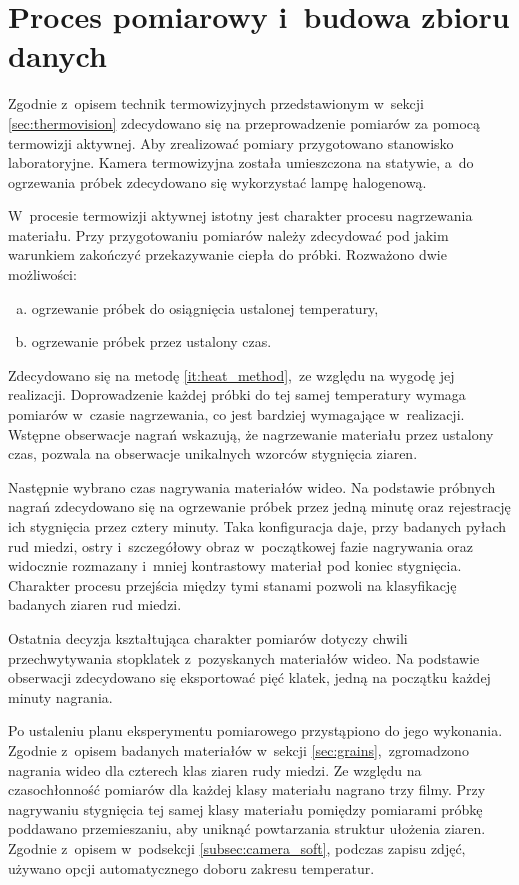 \section{Proces pomiarowy i~budowa zbioru danych} \label{sec:meas}
Zgodnie z~opisem technik termowizyjnych przedstawionym w~sekcji
\ref{sec:thermovision} zdecydowano się na przeprowadzenie pomiarów za pomocą
termowizji aktywnej.
Aby zrealizować pomiary przygotowano stanowisko laboratoryjne.
Kamera termowizyjna została umieszczona na statywie, a~do ogrzewania próbek
zdecydowano się wykorzystać lampę halogenową.

W~procesie termowizji aktywnej istotny jest charakter procesu nagrzewania
materiału.
Przy przygotowaniu pomiarów należy zdecydować pod jakim warunkiem zakończyć
przekazywanie ciepła do próbki.
Rozważono dwie możliwości:
\begin{enumerate}[a)]
	\item ogrzewanie próbek do osiągnięcia ustalonej temperatury,
	\item \label{it:heat_method}
	      ogrzewanie próbek przez ustalony czas.
\end{enumerate}
Zdecydowano się na metodę \ref{it:heat_method},~ze względu na wygodę jej
realizacji.
Doprowadzenie każdej próbki do tej samej temperatury wymaga pomiarów
w~czasie nagrzewania, co jest bardziej wymagające w~realizacji.
Wstępne obserwacje nagrań wskazują, że nagrzewanie materiału przez ustalony
czas, pozwala na obserwacje unikalnych wzorców stygnięcia ziaren.

Następnie wybrano czas nagrywania materiałów wideo.
Na podstawie próbnych nagrań zdecydowano się na ogrzewanie próbek przez jedną
minutę oraz rejestrację ich stygnięcia przez cztery minuty.
Taka konfiguracja daje, przy badanych pyłach rud miedzi, ostry i~szczegółowy
obraz w~początkowej fazie nagrywania oraz widocznie rozmazany i~mniej
kontrastowy materiał pod koniec stygnięcia.
Charakter procesu przejścia między tymi stanami pozwoli na klasyfikację
badanych ziaren rud miedzi.

Ostatnia decyzja kształtująca charakter pomiarów dotyczy chwili
przechwytywania stopklatek z~pozyskanych materiałów wideo.
Na podstawie obserwacji zdecydowano się eksportować pięć klatek, jedną
na początku każdej minuty nagrania.

Po ustaleniu planu eksperymentu pomiarowego przystąpiono do jego wykonania.
Zgodnie z~opisem badanych materiałów w~sekcji \ref{sec:grains},~zgromadzono
nagrania wideo dla czterech klas ziaren rudy miedzi.
Ze względu na czasochłonność pomiarów dla każdej klasy materiału nagrano trzy
filmy.
Przy nagrywaniu stygnięcia tej samej klasy materiału pomiędzy pomiarami
próbkę poddawano przemieszaniu, aby uniknąć powtarzania struktur
ułożenia ziaren.
Zgodnie z~opisem w~podsekcji \ref{subsec:camera_soft}, podczas zapisu
zdjęć, używano opcji automatycznego doboru zakresu temperatur.

